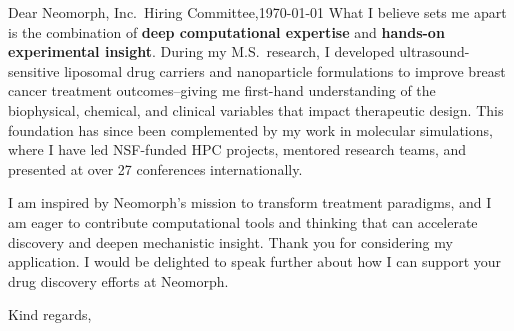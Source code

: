 \documentclass[12pt]{HHUletter}
\begin{document}
\begin{letter}{Dear Neomorph, Inc.~Hiring Committee,\hfill\today}
    What I believe sets me apart is the combination of \textbf{deep computational expertise} and \textbf{hands-on experimental insight}. During my M.S.~research, I developed ultrasound-sensitive liposomal drug carriers and nanoparticle formulations to improve breast cancer treatment outcomes--giving me first-hand understanding of the biophysical, chemical, and clinical variables that impact therapeutic design. This foundation has since been complemented by my work in molecular simulations, where I have led NSF-funded HPC projects, mentored research teams, and presented at over 27 conferences internationally.

		I am inspired by Neomorph's mission to transform treatment paradigms, and I am eager to contribute computational tools and thinking that can accelerate discovery and deepen mechanistic insight. Thank you for considering my application. I would be delighted to speak further about how I can support your drug discovery efforts at Neomorph.

		\closing{Kind regards,}
		
		
		
		
	\end{letter}
	
\end{document}
